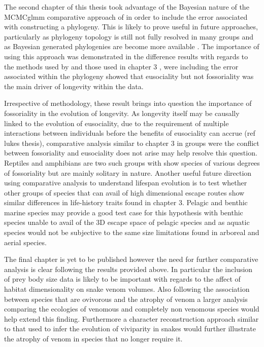 The second chapter of this thesis took advantage of the Bayesian nature of the MCMCglmm comparative approach of \citep{hadfield2010mcmc} in order to include the error associated with constructing a phylogeny. This is likely to prove useful in future approaches, particularly as phylogeny topology is still not fully resolved in many groups \citep{jetz2012global,burleigh2015building,pyron2014early} and as Bayesian generated phylogenies are become more available \citep{arnold201010ktrees,jetz2012global}. The importance of using this approach was demonstrated in the difference results with regards to the methods used by \cite{williams2015ecology} and those used in chapter 3 \citep{healy2014ecology,healy2015eusociality}, were including the error associated within the phylogeny showed that eusociality but not fossoriality was the main driver of longevity within the data. 

Irrespective of methodology, these result brings into question the importance of fossoriality in the evolution of longevity. As longevity itself may be causally linked to the evolution of eusociality, due to the requirement of multiple interactions between individuals before the benefits of eusociality can accrue (ref lukes thesis), comparative analysis similar to chapter 3 in groups were the conflict between fossoriality and eusociality does not arise may help resolve this question. Reptiles and amphibians are two such groups with show species of various degrees of fossoriality but are mainly solitary in nature. Another useful future direction using comparative analysis to understand lifespan evolution is to test whether other groups of species that can avail of high dimensional escape routes show similar differences in life-history traits found in chapter 3. Pelagic and benthic marine species may provide a good test case for this hypothesis with benthic species unable to avail of the 3D escape space of pelagic species and as aquatic species would not be subjective to the same size limitations found in arboreal and aerial species.

The final chapter is yet to be published however the need for further comparative analysis is clear following the results provided above. In particular the inclusion of prey body size data is likely to be important with regards to the affect of habitat dimensionality on snake venom volumes. Also following the association between species that are ovivorous and the atrophy of venom a larger analysis comparing the ecologies of venomous and completely non venomous species would help extend this finding.  Furthermore a character reconstruction approach similar to that used to infer the evolution of viviparity in snakes \citep{pyron2014early} would further illustrate the atrophy of venom in species that no longer require it. 


